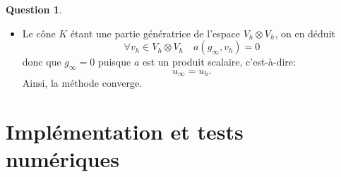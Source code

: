 \documentclass[11pt]{article}
\newcommand{\RR}{\mathbb{R}}
\theoremstyle{definition}
\newtheorem{ques}{Question}
\theoremstyle{plain}
\newtheorem{lem}{Lemme}[section]
\begin{document}
\begin{ques}
\begin{itemize}
En passant à la limite dans l'inégalité démontrée plus haut, on obtient
\[
\frac 12 \|\delta r\otimes\delta s\|_{H^1}^2 - a(g_\infty,\delta r\otimes\delta s) \geq 0\quad\forall (\delta r,\delta s)\in V_h\times V_h
\]

On termine en appliquant le lemme suivant:
\begin{lem}
	Soit $E$ un espace vectoriel normé et $f\colon E\longrightarrow\RR$ une forme linéaire sur $E$. On suppose qu'il existe une constante $C > 0$ et un cône positif $K$ tels que
	\[
	\forall x\in K\quad |f(x)| \leq C\|x\|^2.
	\]
	Alors $f$ est nulle sur $K$.
\end{lem}

L'application du lemme se fait à l'ensemble $K = \{\delta r\otimes \delta s,(\delta r,\delta s)\in V_h\times V_h \}$, dont on voit que c'est un cône positif de $V_h\otimes V_h$.

La démonstration du lemme: si $x\in K$, alors on a pour tout $t > 0$ que $tx\in K$ et $t|f(x)| \leq Ct^2\|x\|^2$ donc $|f(x)| \leq Ct\|x\|^2$, puis $f(x) = 0$.  


\item Le cône $K$ étant une partie génératrice de l'espace $V_h\otimes V_h$, on en déduit
\[
\forall v_h\in V_h\otimes V_h\quad
a(g_\infty,v_h) = 0
\]
donc que $\boxed{g_\infty = 0}$ puisque $a$ est un produit scalaire, c'est-à-dire:
\[\boxed{u_\infty = u_h.}\]
Ainsi, la méthode converge.
\end{itemize}

\end{ques}

\section{Implémentation et tests numériques}
\end{document}
